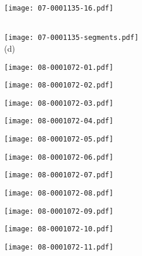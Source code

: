 \documentclass[10pt,twocolumn,letterpaper]{article}
\begin{document}
\begin{figure*}[t]
 \begin{minipage}{0.058\textwidth} \centering \texttt{[image: 07-0001135-16.pdf]} \end{minipage}
 \\ \vspace{2mm}
 \texttt{[image: 07-0001135-segments.pdf]}
 \\
 (d)
 \\ \vspace{2mm}
 \begin{minipage}{0.058\textwidth} \centering \texttt{[image: 08-0001072-01.pdf]} \end{minipage}
 \begin{minipage}{0.058\textwidth} \centering \texttt{[image: 08-0001072-02.pdf]} \end{minipage}
 \begin{minipage}{0.058\textwidth} \centering \texttt{[image: 08-0001072-03.pdf]} \end{minipage}
 \begin{minipage}{0.058\textwidth} \centering \texttt{[image: 08-0001072-04.pdf]} \end{minipage}
 \begin{minipage}{0.058\textwidth} \centering \texttt{[image: 08-0001072-05.pdf]} \end{minipage}
 \begin{minipage}{0.058\textwidth} \centering \texttt{[image: 08-0001072-06.pdf]} \end{minipage}
 \begin{minipage}{0.058\textwidth} \centering \texttt{[image: 08-0001072-07.pdf]} \end{minipage}
 \begin{minipage}{0.058\textwidth} \centering \texttt{[image: 08-0001072-08.pdf]} \end{minipage}
 \begin{minipage}{0.058\textwidth} \centering \texttt{[image: 08-0001072-09.pdf]} \end{minipage}
 \begin{minipage}{0.058\textwidth} \centering \texttt{[image: 08-0001072-10.pdf]} \end{minipage}
 \begin{minipage}{0.058\textwidth} \centering \texttt{[image: 08-0001072-11.pdf]} \end{minipage}

\end{figure*}
\end{document}
